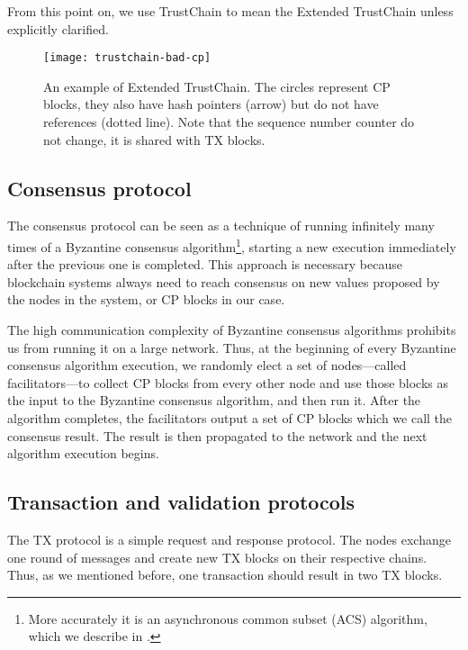 From this point on, we use TrustChain to mean the Extended TrustChain unless explicitly clarified.

\begin{figure}
    \texttt{[image: trustchain-bad-cp]}
    \centering
    \caption{
    An example of Extended TrustChain.
    The circles represent CP blocks,
    they also have hash pointers (arrow) but do not have references (dotted line).
    Note that the sequence number counter do not change, it is shared with TX blocks.}
    \label{fig:trustchain-bad-cp}
\end{figure}

\subsection*{Consensus protocol}

The consensus protocol can be seen as a technique of running infinitely many times of a Byzantine consensus algorithm\footnote{More accurately it is an asynchronous common subset (ACS) algorithm, which we describe in .},
starting a new execution immediately after the previous one is completed.
This approach is necessary because blockchain systems always need to reach consensus on new values proposed by the nodes in the system,
or CP blocks in our case.

The high communication complexity of Byzantine consensus algorithms prohibits us from running it on a large network.
Thus, at the beginning of every Byzantine consensus algorithm execution,
we randomly elect a set of nodes---called facilitators---to collect CP blocks from every other node and use those blocks as the input to the Byzantine consensus algorithm, and then run it.
After the algorithm completes,
the facilitators output a set of CP blocks which we call the consensus result.
The result is then propagated to the network and the next algorithm execution begins.

\subsection*{Transaction and validation protocols}
The TX protocol is a simple request and response protocol.
The nodes exchange one round of messages and create new TX blocks on their respective chains.
Thus, as we mentioned before, one transaction should result in two TX blocks.

